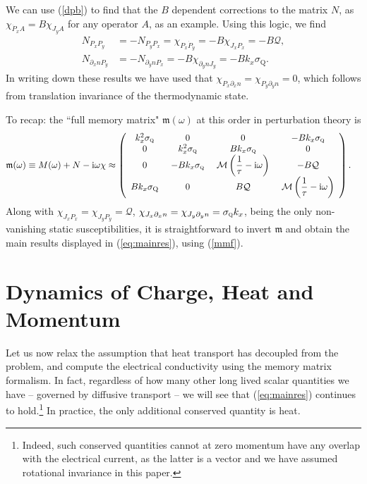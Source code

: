 \documentclass[10pt, oneside]{book}
\begin{document}
\begin{doublespace}
We can use (\ref{dpb}) to find that the $B$ dependent corrections to the matrix $N$, as $\chi_{\dot{P}_x A} = B \chi_{J_yA}$ for any operator $A$, as an example.   Using this logic, we find  \begin{subequations}\begin{align}
N_{P_x P_y} &= -N_{P_yP_x} = \chi_{P_x\dot{P}_y} = -B\chi_{J_xP_x} = -B\mathcal{Q}, \\
N_{\partial_x n P_y} &= -N_{\partial_y n P_x} = -B\chi_{\partial_y n J_y} = -Bk_x\sigma_{\mathrm{Q}}.
\end{align}\end{subequations}
In writing down these results we have used that $\chi_{P_x\partial_x n} = \chi_{P_y\partial_y n} = 0$, which follows from translation invariance of the thermodynamic state.

To recap:  the ``full memory matrix" $\mathfrak{m}(\omega)$ at this order in perturbation theory is\begin{align}
\mathfrak{m}(\omega) &\equiv M(\omega) + N-\mathrm{i}\omega \chi \approx \left(\begin{array}{cccc} k_x^2\sigma_{\textsc{q}} &\ 0 &\ 0 &\ -Bk_x\sigma_{\textsc{q}} \\ 0 &\ k_x^2\sigma_{\textsc{q}} &\ Bk_x\sigma_{\textsc{q}} &\ 0 \\ 0 &\  -Bk_x\sigma_{\textsc{q}} &\ \mathcal{M}\left(\dfrac{1}{\tau}-\mathrm{i}\omega\right) &\ -B\mathcal{Q} \\  Bk_x\sigma_{\mathrm{Q}}  &\ 0 &\ B\mathcal{Q} &\  \mathcal{M}\left(\dfrac{1}{\tau}-\mathrm{i}\omega\right) \end{array}\right).  \label{mfull}
\end{align}Along with $\chi_{J_xP_x}=  \chi_{J_yP_y} = \mathcal{Q}$,  $\chi_{J_x\partial_x n } = \chi_{J_y\partial_y n} = \sigma_{\textsc{q}}k_x$, being the only non-vanishing static susceptibilities, it is straightforward to invert $\mathfrak{m}$ and obtain the main results 
displayed in (\ref{eq:mainres}), using (\ref{mmf}).

\section{Dynamics of Charge, Heat and Momentum}\label{appa}
Let us now relax the assumption that heat transport has decoupled from the problem, and compute the electrical conductivity using the memory matrix formalism.   In fact, regardless of how many other long lived scalar quantities we have -- governed by diffusive transport -- we will see that (\ref{eq:mainres}) continues to hold.\footnote{Indeed, such conserved quantities cannot at zero momentum have any overlap with the electrical current, as the latter is a vector and we have assumed rotational invariance in this paper.}   In practice, the only additional conserved quantity is heat.   
 

\end{doublespace}
\end{document}
